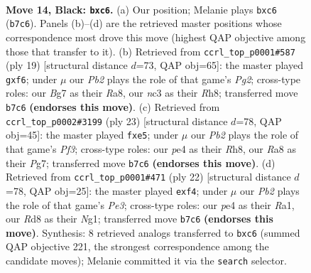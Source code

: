 \documentclass[11pt]{article}
\begin{document}
\begin{figure}[p]
\label{fig:thought-m25}
\end{figure}

\clearpage

\begin{figure}[p]\centering
\begin{subfigure}{0.46\textwidth}\centering
\resizebox{\linewidth}{!}{%
\newchessgame
\chessboard[
  setfen={rn1r1k2/pp3pbp/2P2np1/4p3/P3P1bP/2N2N2/2P1BP2/R1B2RK1 b - - 0 14},
  showmover=false,
  pgfstyle=straightmove, color=movearrow, markmove={b7-c6}
]}
\caption{}
\end{subfigure}\hfill
\begin{subfigure}{0.46\textwidth}\centering
\resizebox{\linewidth}{!}{%
\newchessgame
\chessboard[
  setfen={r3kbnr/pp1b2pp/2n1pP2/1B1p4/5B2/2N2N2/PPP2PPP/R3K2R b KQkq - 0 10},
  showmover=false,
  pgfstyle=straightmove, color=movearrow, markmove={g7-f6}
]}
\caption{}
\end{subfigure}
\\[4pt]
\begin{subfigure}{0.46\textwidth}\centering
\resizebox{\linewidth}{!}{%
\newchessgame
\chessboard[
  setfen={r3kb1r/ppp3pp/1nn2p2/4P3/6b1/2N2NP1/P3PPBP/1RBR2K1 b kq - 0 12},
  showmover=false,
  pgfstyle=straightmove, color=movearrow, markmove={f6-e5}
]}
\caption{}
\end{subfigure}\hfill
\begin{subfigure}{0.46\textwidth}\centering
\resizebox{\linewidth}{!}{%
\newchessgame
\chessboard[
  setfen={r1bb1rk1/1pp3pp/2n2n2/p7/2P2p2/PPB1P3/4BPPP/RN2K1NR w KQ - 0 12},
  showmover=false,
  pgfstyle=straightmove, color=movearrow, markmove={e3-f4}
]}
\caption{}
\end{subfigure}
\caption{\textbf{Move 14, Black: \texttt{bxc6}.} (a) Our position; Melanie plays \texttt{bxc6} (\texttt{b7c6}). Panels (b)--(d) are the retrieved master positions whose correspondence most drove this move (highest QAP objective among those that transfer to it). (b) Retrieved from \texttt{ccrl\_top\_p0001\#587} (ply 19) [structural distance $d$=73, QAP obj=65]: the master played \texttt{gxf6}; under $\mu$ our \emph{Pb2} plays the role of that game's \emph{Pg2}; cross-type roles: our \emph{B}g7 as their \emph{R}a8, our \emph{n}c3 as their \emph{R}h8; transferred move \texttt{b7c6} \textbf{(endorses this move)}. (c) Retrieved from \texttt{ccrl\_top\_p0002\#3199} (ply 23) [structural distance $d$=78, QAP obj=45]: the master played \texttt{fxe5}; under $\mu$ our \emph{Pb2} plays the role of that game's \emph{Pf3}; cross-type roles: our \emph{p}e4 as their \emph{R}h8, our \emph{R}a8 as their \emph{P}g7; transferred move \texttt{b7c6} \textbf{(endorses this move)}. (d) Retrieved from \texttt{ccrl\_top\_p0001\#471} (ply 22) [structural distance $d$=78, QAP obj=25]: the master played \texttt{exf4}; under $\mu$ our \emph{Pb2} plays the role of that game's \emph{Pe3}; cross-type roles: our \emph{p}e4 as their \emph{R}a1, our \emph{R}d8 as their \emph{N}g1; transferred move \texttt{b7c6} \textbf{(endorses this move)}. Synthesis: 8 retrieved analogs transferred to \texttt{bxc6} (summed QAP objective 221, the strongest correspondence among the candidate moves); Melanie committed it via the \texttt{search} selector.}

\end{figure}
\end{document}
